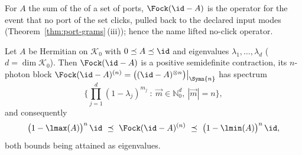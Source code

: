 
For $A$ the sum of the  of a set of ports,
$\Fock(\id-A)$ is the operator for the event that no port of the set clicks,
pulled back to the declared input modes (Theorem~\ref{thm:port-grams}\,(iii));
hence the name lifted no-click operator.

\begin{lemma}
\label{lem:fock-block-spectrum}
Let $A$ be Hermitian on $\mathcal{K}_0$ with $0\preceq A\preceq\id$ and
eigenvalues $\lambda_1,\dots,\lambda_d$ ($d=\dim\mathcal{K}_0$). Then
$\Fock(\id-A)$ is a positive semidefinite contraction, its $n$-photon block
$\Fock(\id-A)^{(n)}=\big((\id-A)^{\otimes n}\big)\big|_{\Symn{n}}$ has spectrum
\begin{equation}\label{eq:spectrum}
  \Big\{\textstyle\prod_{j=1}^{d}(1-\lambda_j)^{m_j}\ :\
  \vec m\in\mathbb{N}_0^{d},\ |\vec m|=n\Big\},
\end{equation}
and consequently
\begin{equation}\label{eq:blockbounds}
  \big(1-\lmax(A)\big)^{n}\,\id\ \preceq\ \Fock(\id-A)^{(n)}\ \preceq\
  \big(1-\lmin(A)\big)^{n}\,\id ,
\end{equation}
both bounds being attained as eigenvalues.
\end{lemma}

